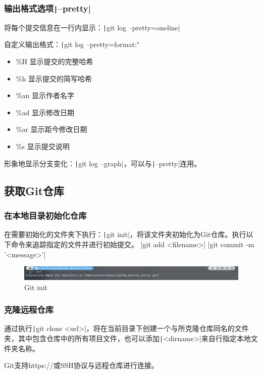 \documentclass[fontset=ubuntu]{ctexart}
\begin{document}
\subsubsection{输出格式选项\texttt|--pretty|}
将每个提交信息在一行内显示：\texttt|git log --pretty=oneline|

自定义输出格式：\texttt|git log --pretty=format:"%
\begin{itemize}
\item \%H 显示提交的完整哈希
\item \%h 显示提交的简写哈希
\item  \%an 显示作者名字
\item  \%ad 显示修改日期 
\item  \%ar 显示距今修改日期 
\item  \%s 显示提交说明 
\end{itemize}

形象地显示分支变化：\texttt|git log --graph|，可以与\texttt|--pretty|连用。

\subsection{获取Git仓库}
\subsubsection{在本地目录初始化仓库}
在需要初始化的文件夹下执行：\texttt|git init|，将该文件夹初始化为Git仓库。执行以下命令来追踪指定的文件并进行初始提交。
|git add <filename>|
|git commit -m '<message>'|
\begin{figure}
    \centering
    \includegraphics[width=0.5\linewidth]{Git init.png}
    \caption{Git init}
    \label{fig:Git init}
\end{figure}

\subsubsection{克隆远程仓库}
通过执行\texttt|git clone <url>|，将在当前目录下创建一个与所克隆仓库同名的文件夹，其中包含仓库中的所有项目文件，也可以添加\texttt|<dirname>|来自行指定本地文件夹名称。

Git支持https://或SSH协议与远程仓库进行连接。
\end{document}
